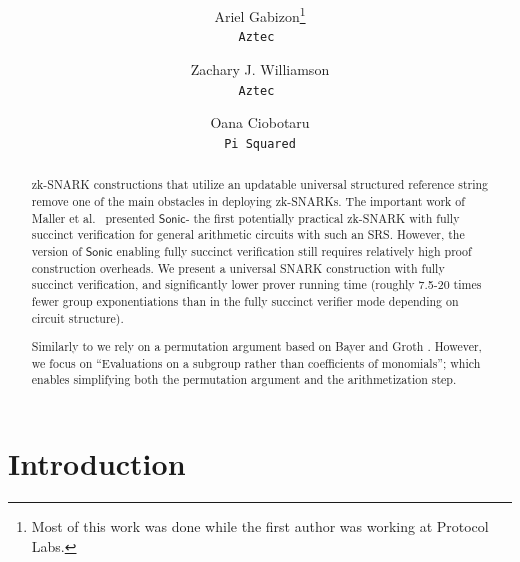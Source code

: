\documentclass[11pt]{article} %
\title{ \bf \papertitle \\[0.72cm]}
\author{ Ariel Gabizon\thanks{Most of this work was done while the first author was working at Protocol Labs.}\\ \tt{Aztec}  \and Zachary J. Williamson\\ \tt{Aztec} \and Oana Ciobotaru\\ \tt{Pi Squared}}
\newcommand{\sonic}{\ensuremath{\mathsf{Sonic}}\xspace}
\begin{document}
    \maketitle

\begin{abstract}
	zk-SNARK constructions that utilize an updatable universal structured reference string remove one of the main obstacles in deploying zk-SNARKs\cite{firstUniversal}. The important work of Maller et al.\ \cite{sonic} presented \sonic\;- the first potentially practical zk-SNARK with fully succinct verification for general arithmetic circuits with such an SRS.
	However, the version of \sonic enabling fully succinct verification still requires relatively high proof construction overheads. We present a universal SNARK construction with fully succinct verification, and significantly lower prover running time (roughly 7.5-20 times fewer group exponentiations than \cite{sonic} in the fully succinct verifier mode depending on circuit structure).
	
	Similarly to \cite{sonic} we rely on a permutation argument based on Bayer and Groth \cite{permorig}. However, we focus on ``Evaluations on a subgroup rather than coefficients of monomials''; which enables simplifying both the permutation argument and the arithmetization step.
\end{abstract}

\section{Introduction}
% 
% 
% 
% 
% 
% 
\end{document}
